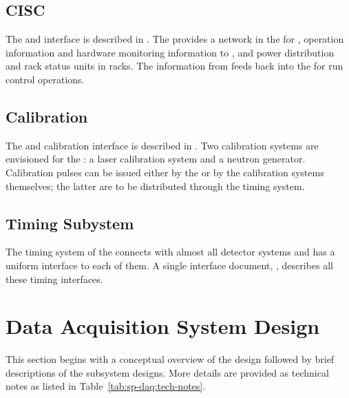 \subsection{CISC}

\label{sec:sp-daq:interfaces-cisc}
The  and  interface is described in
. The  provides a network in the  for ,  operation information and hardware
monitoring information to , and power distribution and
rack status units in  racks. The information from 
feeds back into the  for run control operations.

\subsection{Calibration}

The  and calibration interface is described in
. Two calibration systems are envisioned for the
: a laser calibration system and a neutron
generator. Calibration pulses can be issued either by the  or by
the calibration systems themselves;  %
the latter are to be distributed through the
 timing system.


\subsection{Timing Subystem}

The timing system of the   connects with
almost all detector systems and has a uniform interface to each of
them. %
A single interface document,
, describes all these timing interfaces. 



\section{Data Acquisition System Design}
\label{sec:fd-daq:design}


This section %
begins with a conceptual overview of the  design followed by %
brief descriptions of the subsystem designs. 
More details are provided as technical notes as listed in Table~\ref{tab:sp-daq:tech-notes}.

